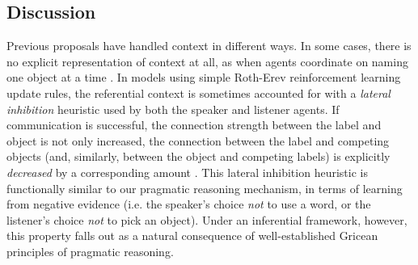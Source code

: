 \subsection{Discussion}

Previous proposals have handled context in different ways.
In some cases, there is no explicit representation of context at all, as when agents coordinate on naming one object at a time \cite{Baronchelli,oldnaminggame}. 
In models using simple Roth-Erev reinforcement learning update rules, the referential context is sometimes accounted for with a \emph{lateral inhibition} heuristic used by both the speaker and listener agents.
If communication is successful, the connection strength between the label and object is not only increased, the connection between the label and competing objects (and, similarly, between the object and competing labels) is explicitly \emph{decreased} by a corresponding amount \cite{steels2005coordinating}.
This lateral inhibition heuristic is functionally similar to our pragmatic reasoning mechanism, in terms of learning from negative evidence (i.e. the speaker's choice \emph{not} to use a word, or the listener's choice \emph{not} to pick an object). 
Under an inferential framework, however, this property falls out as a natural consequence of well-established Gricean principles of pragmatic reasoning.


